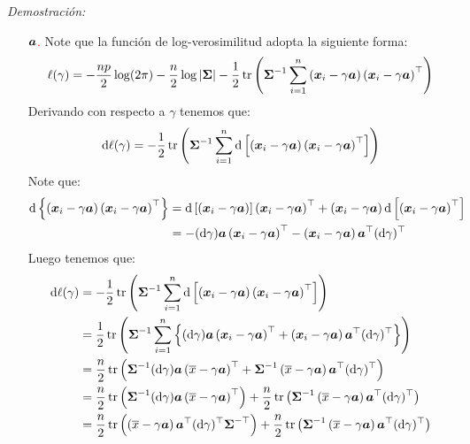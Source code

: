 \emph{Demostración:}
\begin{itemize}
\item[\textcolor{red}{$\bf{a}$.}] Note que la función de log-verosimilitud adopta la siguiente forma:
$$
\ell(\gamma)=-\frac{np}{2}\log(2\pi)-\frac{n}{2} \log |\boldsymbol{\Sigma}|-\frac{1}{2} \operatorname{tr}\left( \boldsymbol{\Sigma}^{-1}\suma \parcurvo{
\bf{x}_i - \gamma\bf{a}
}\parcurvo{
\bf{x}_i - \gamma\bf{a}
}^\top\right)
$$
Derivando con respecto a $\gamma$ tenemos que:
\begin{align*}
\de \ell (\gamma ) = -\dfrac{1}{2} \tr \parcurvo{
\bf{\Sigma}^{-1} \suma \de \parcerrado{ \parcurvo{
\bf{x}_i - \gamma\bf{a}
}\parcurvo{
\bf{x}_i - \gamma\bf{a}
}^\top}
}
\end{align*}
Note que:
\begin{align*}
 \de\parllave{
        \parcurvo{
\bf{x}_i - \gamma\bf{a}
}\parcurvo{
\bf{x}_i - \gamma\bf{a}
}^\top
    } &= \de\parcerrado{  \parcurvo{
\bf{x}_i - \gamma\bf{a}
}}\parcurvo{
\bf{x}_i - \gamma\bf{a}
}^\top + \parcurvo{
\bf{x}_i - \gamma\bf{a}
}\de\parcerrado{
\parcurvo{
\bf{x}_i - \gamma\bf{a}
}^\top
}\\
&= -(\de \gamma)\bf{a} \parcurvo{
\bf{x}_i - \gamma\bf{a}
}^\top - \parcurvo{
\bf{x}_i - \gamma\bf{a}
}\bf{a}^\top(\de \gamma)^\top
\end{align*}
Luego tenemos que:
\begin{align*}
\de \ell (\gamma ) &= -\dfrac{1}{2} \tr \parcurvo{
\bf{\Sigma}^{-1} \suma \de \parcerrado{ \parcurvo{
\bf{x}_i - \gamma\bf{a}
}\parcurvo{
\bf{x}_i - \gamma\bf{a}
}^\top}
}\\
&=  \dfrac{1}{2} \tr \parcurvo{
\bf{\Sigma}^{-1} \suma \parllave{(\de \gamma)\bf{a} \parcurvo{
\bf{x}_i - \gamma\bf{a}
}^\top + \parcurvo{
\bf{x}_i - \gamma\bf{a}
}\bf{a}^\top(\de \gamma)^\top}
}\\
&= \dfrac{n}{2} \tr\parcurvo{
\bf{\Sigma}^{-1} (\de \gamma)\bf{a}\parcurvo{\barra{x} - \gamma \bf{a}}^\top + \bf{\Sigma}^{-1}\parcurvo{ \barra{x} - \gamma\bf{a}}\bf{a}^\top (\de \gamma)^\top
}\\
&= \dfrac{n}{2} \tr\parcurvo{
\bf{\Sigma}^{-1} (\de \gamma)\bf{a}\parcurvo{\barra{x} - \gamma \bf{a}}^\top} +\dfrac{n}{2}  \tr\parcurvo{\bf{\Sigma}^{-1}\parcurvo{ \barra{x} - \gamma\bf{a}}\bf{a}^\top (\de \gamma)^\top
}\\
&= \dfrac{n}{2} \tr\parcurvo{
\parcurvo{\barra{x} - \gamma \bf{a}} \bf{a}^\top  (\de \gamma)^\top \bf{\Sigma}^{-\top}} + \dfrac{n}{2} \tr\parcurvo{\bf{\Sigma}^{-1}\parcurvo{ \barra{x} - \gamma\bf{a}}\bf{a}^\top (\de \gamma)^\top
}
\end{align*}
\end{itemize}
